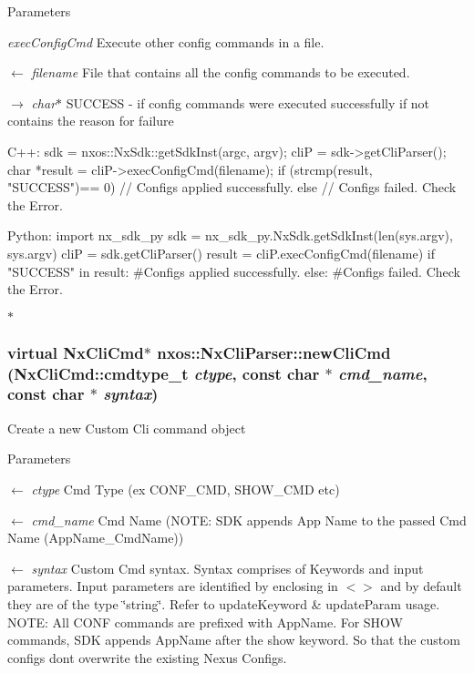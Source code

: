 \begin{DoxyParams}{Parameters}
\item[{\em execConfigCmd}]Execute other config commands in a file. \item[\mbox{$\leftarrow$} {\em filename}]File that contains all the config commands to be executed. \item[\mbox{$\rightarrow$} {\em char$\ast$}]SUCCESS -\/ if config commands were executed successfully if not contains the reason for failure 
\begin{DoxyCode}
  C++:
       sdk = nxos::NxSdk::getSdkInst(argc, argv);
       cliP = sdk->getCliParser();
       char *result = cliP->execConfigCmd(filename);
       if (strcmp(result, "SUCCESS")== 0) {
           // Configs applied successfully.
       } else {
           // Configs failed. Check the Error.
       }

  Python:
       import nx_sdk_py
       sdk = nx_sdk_py.NxSdk.getSdkInst(len(sys.argv), sys.argv)
       cliP = sdk.getCliParser()
       result = cliP.execConfigCmd(filename)
       if "SUCCESS" in result:
           #Configs applied successfully.
       else:
           #Configs failed. Check the Error.
\end{DoxyCode}
 $\ast$ \end{DoxyParams}
\hypertarget{classnxos_1_1NxCliParser_a210cbbb8b312093285741f753c4cdcda}{
\subsubsection[{newCliCmd}]{\setlength{\rightskip}{0pt plus 5cm}virtual {\bf NxCliCmd}$\ast$ nxos::NxCliParser::newCliCmd ({\bf NxCliCmd::cmdtype\_\-t} {\em ctype}, \/  const char $\ast$ {\em cmd\_\-name}, \/  const char $\ast$ {\em syntax})}}
\label{classnxos_1_1NxCliParser_a210cbbb8b312093285741f753c4cdcda}
Create a new Custom Cli command object 
\begin{DoxyParams}{Parameters}
\item[\mbox{$\leftarrow$} {\em ctype}]Cmd Type (ex CONF\_\-CMD, SHOW\_\-CMD etc) \item[\mbox{$\leftarrow$} {\em cmd\_\-name}]Cmd Name (NOTE: SDK appends App Name to the passed Cmd Name (AppName\_\-CmdName)) \item[\mbox{$\leftarrow$} {\em syntax}]Custom Cmd syntax. Syntax comprises of Keywords and input parameters. Input parameters are identified by enclosing in $<$$>$ and by default they are of the type \char`\"{}string\char`\"{}. Refer to updateKeyword \& updateParam usage. NOTE: All CONF commands are prefixed with AppName. For SHOW commands, SDK appends AppName after the show keyword. So that the custom configs dont overwrite the existing Nexus Configs.\end{DoxyParams}

